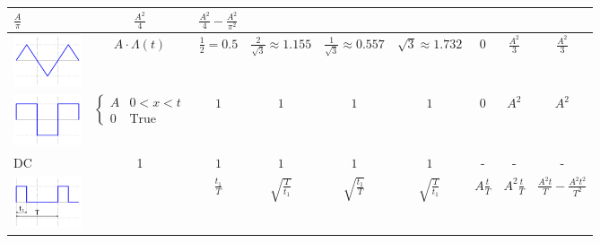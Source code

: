 \begin{table}
\begin{center}
\begin{tabular}{|l|c|c|c|c|c|c|c|c|}
	$\frac{A}{\pi}$ &
	$\frac{A^2}{4}$ & $\frac{A^2}{4}-\frac{A^2}{\pi^2}$
	\\
\hline
	\includegraphics[width=2cm]{table/images/table_triangle_wave.png} &
	$A\cdot\Lambda(t)$ &
	$\frac{1}{2}= 0.5$ &
	$\frac{2}{\sqrt{3}}\approx 1.155$ &
	$\frac{1}{\sqrt{3}}
	\approx 0.557$ &
	$\sqrt{3} \approx 1.732$ &
	$0$ &
	$\frac{A^2}{3}$ &
	$\frac{A^2}{3}$ \\
\hline	
	\includegraphics[width=2cm]{table/images/table_square_wave.png} &
	$\begin{cases} A & 0<x<t \\ 0 & \text{True}\end{cases}$ &
	$1$ &
	$1$ &
	$1$ &
	$1$ &
	$0$ &
	$A^2$ &
	$A^2$ \\
\hline	
	DC&
	1&
	$1$ &
	$1$ &
	$1$ &
	$1$  &
	-&
	-&
	-\\
\hline	
	\includegraphics[width=2cm]{table/images/table_pulse_wide_wave.png} &
	&
	$\frac{t_1}{T}$ & $\sqrt{\frac{T}{t_1}}$ & $\sqrt{\frac{t_1}{T}}$ & $\sqrt{\frac{T}{t_1}}$ &
	$A\frac{t}{T}$ &
	$A^2\frac{t}{T}$ &
	$\frac{A^2t}{T}-\frac{A^2t^2}{T^2}$\\
\hline
\end{tabular}
\end{center}
\end{table}

